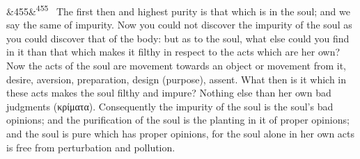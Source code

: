 \documentclass[12pt]{article}
\newcommand{\para}[1][]{\par\noindent\ifx&#1&\else\textsuperscript{\footnotesize #1}~\fi}
\begin{document}
\para[455] The first then and highest purity is that which is in the soul; and we say the same of impurity. Now you could not discover the impurity of the soul as you could discover that of the body: but as to the soul, what else could you find in it than that which makes it filthy in respect to the acts which are her own? Now the acts of the soul are movement towards an object or movement from it, desire, aversion, preparation, design (purpose), assent. What then is it which in these acts makes the soul filthy and impure? Nothing else than her own bad judgments (κρίματα). Consequently the impurity of the soul is the soul's bad opinions; and the purification of the soul is the planting in it of proper opinions; and the soul is pure which has proper opinions, for the soul alone in her own acts is free from perturbation and pollution.
\end{document}
